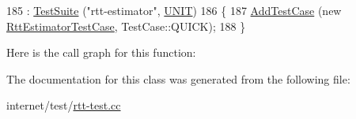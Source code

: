 \begin{DoxyCode}
185     : \hyperlink{classns3_1_1TestSuite_a904b0c40583b744d30908aeb94636d1a}{TestSuite} (\textcolor{stringliteral}{"rtt-estimator"}, \hyperlink{classns3_1_1TestSuite_a1ebfcab34ec8161e085e8e3a1855eae0a3885375a3787abf60431f8454b3cadbd}{UNIT})
186   \{
187     \hyperlink{classns3_1_1TestCase_a3718088e3eefd5d6454569d2e0ddd835}{AddTestCase} (\textcolor{keyword}{new} \hyperlink{classRttEstimatorTestCase}{RttEstimatorTestCase}, TestCase::QUICK);
188   \}
\end{DoxyCode}


Here is the call graph for this function\+:




The documentation for this class was generated from the following file\+:\begin{DoxyCompactItemize}
\item 
internet/test/\hyperlink{rtt-test_8cc}{rtt-\/test.\+cc}\end{DoxyCompactItemize}

